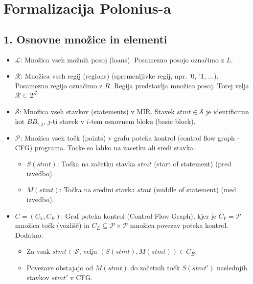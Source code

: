 \documentclass{article}
\begin{document}
\section*{Formalizacija Polonius-a}

\subsection*{1. Osnovne množice in elementi}
\begin{itemize}
	\item $\mathcal{L}$: Množica vseh možnih posoj (loans). Posamezno posojo označimo z $L$.
	\item $\mathcal{R}$: Množica vseh regij (regions) (spremenljivke regij, npr. '0, '1, ...). Posamezno regijo označimo z $R$. Regija predstavlja množico posoj. Torej velja $\mathcal{R} \subset 2^{\mathcal{L}}$
	\item $\mathcal{S}$: Množica vseh stavkov (statements) v MIR. Stavek $stmt \in \mathcal{S}$ je identificiran kot $BB_{i,j}$, $j$-ti stavek v $i$-tem osnovnem bloku (basic block).
	\item $\mathcal{P}$: Množica vseh točk (points) v grafu poteka kontrol (control flow graph - CFG) programa. Tocke so lahko na zacetku ali sredi stavka.
	      \begin{itemize}
		      \item $S(stmt)$: Točka na začetku stavka $stmt$ (start of statement) (pred izvedbo).
		      \item $M(stmt)$: Točka na sredini stavka $stmt$ (middle of statement) (med izvedbo).
	      \end{itemize}
	\item $C = (C_V, C_E)$: Graf poteka kontrol (Control Flow Graph), kjer je $C_V = \mathcal{P}$ množica točk (vozlišč) in $C_E \subseteq \mathcal{P} \times \mathcal{P}$ množica povezav poteka kontrol. Dodatno:
	      \begin{itemize}
		      \item Za vsak $stmt \in \mathcal{S}$, velja $(S(stmt), M(stmt)) \in C_E$.
		      \item Povezave obstajajo od $M(stmt)$ do začetnih točk $S(stmt')$ naslednjih stavkov $stmt'$ v CFG.
	      \end{itemize}
\end{itemize}
\end{document}

